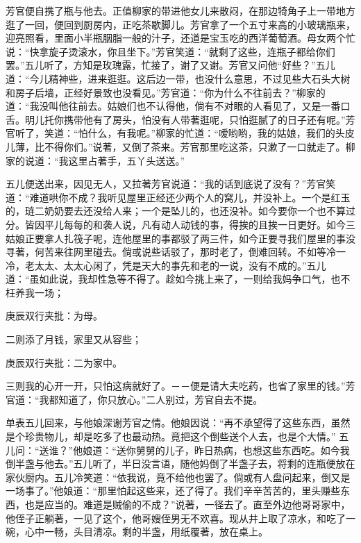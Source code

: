 \begin{parag}
    芳官便自携了瓶与他去。正值柳家的带进他女儿来散闷，在那边犄角子上一带地方逛了一回，便回到厨房内，正吃茶歇脚儿。芳官拿了一个五寸来高的小玻璃瓶来，迎亮照看，里面小半瓶胭脂一般的汁子，还道是宝玉吃的西洋葡萄酒。母女两个忙说：“快拿旋子烫滚水，你且坐下。”芳官笑道：“就剩了这些，连瓶子都给你们罢。”五儿听了，方知是玫瑰露，忙接了，谢了又谢。芳官又问他“好些？”五儿道：“今儿精神些，进来逛逛。这后边一带，也没什么意思，不过见些大石头大树和房子后墙，正经好景致也没看见。”芳官道：“你为什么不往前去？”柳家的道：“我没叫他往前去。姑娘们也不认得他，倘有不对眼的人看见了，又是一番口舌。明儿托你携带他有了房头，怕没有人带著逛呢，只怕逛腻了的日子还有呢。”芳官听了，笑道：“怕什么，有我呢。”柳家的忙道：“嗳哟哟，我的姑娘，我们的头皮儿薄，比不得你们。”说著，又倒了茶来。芳官那里吃这茶，只漱了一口就走了。柳家的说道：“我这里占著手，五丫头送送。”
\end{parag}


\begin{parag}
    五儿便送出来，因见无人，又拉著芳官说道：“我的话到底说了没有？”芳官笑道：“难道哄你不成？我听见屋里正经还少两个人的窝儿，并没补上。一个是红玉的，琏二奶奶要去还没给人来；一个是坠儿的，也还没补。如今要你一个也不算过分。皆因平儿每每的和袭人说，凡有动人动钱的事，得挨的且挨一日更好。如今三姑娘正要拿人扎筏子呢，连他屋里的事都驳了两三件，如今正要寻我们屋里的事没寻著，何苦来往网里碰去。倘或说些话驳了，那时老了，倒难回转。不如等冷一冷，老太太、太太心闲了，凭是天大的事先和老的一说，没有不成的。”五儿道：“虽如此说，我却性急等不得了。趁如今挑上来了，一则给我妈争口气，也不枉养我一场；\begin{note}庚辰双行夹批：为母。\end{note}二则添了月钱，家里又从容些；\begin{note}庚辰双行夹批：二为家中。\end{note}三则我的心开一开，只怕这病就好了。－－便是请大夫吃药，也省了家里的钱。”芳官道：“我都知道了，你只放心。”二人别过，芳官自去不提。
\end{parag}


\begin{parag}
    单表五儿回来，与他娘深谢芳官之情。他娘因说：“再不承望得了这些东西，虽然是个珍贵物儿，却是吃多了也最动热。竟把这个倒些送个人去，也是个大情。” 五儿问：“送谁？”他娘道：“送你舅舅的儿子，昨日热病，也想这些东西吃。如今我倒半盏与他去。”五儿听了，半日没言语，随他妈倒了半盏子去，将剩的连瓶便放在家伙厨内。五儿冷笑道：“依我说，竟不给他也罢了。倘或有人盘问起来，倒又是一场事了。”他娘道：“那里怕起这些来，还了得了。我们辛辛苦苦的，里头赚些东西，也是应当的。难道是贼偷的不成？”说著，一径去了。直至外边他哥哥家中，他侄子正躺著，一见了这个，他哥嫂侄男无不欢喜。现从井上取了凉水，和吃了一碗，心中一畅，头目清凉。剩的半盏，用纸覆著，放在桌上。
\end{parag}


